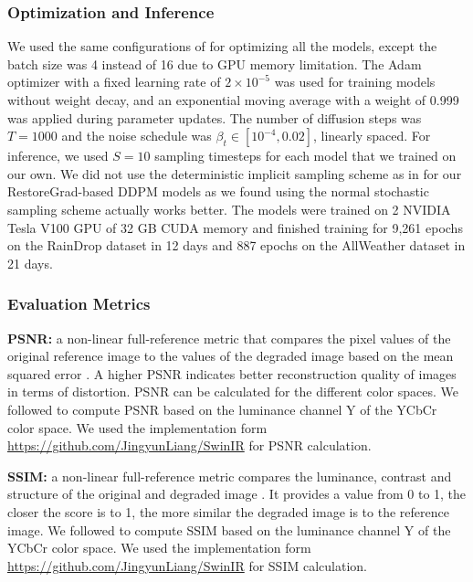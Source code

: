 \subsubsection{Optimization and Inference}
\label{appendix: opt and infer of ir for weather}
We used the same configurations of \citet{ozdenizci2023restoring} for optimizing all the models, except the batch size was 4 instead of 16 due to GPU memory limitation. The Adam optimizer with a fixed learning rate of $2\times 10^{-5}$ was used for training models without weight decay, and an exponential moving average with a weight of 0.999 was applied during parameter updates. The number of diffusion steps was $T=1000$ and the noise schedule was $\beta_t\in[10^{-4}, 0.02]$, linearly spaced. For inference, we used $S=10$ sampling timesteps for each model that we trained on our own. We did not use the deterministic implicit sampling scheme as in \citet{ozdenizci2023restoring} for our RestoreGrad-based DDPM models as we found using the normal stochastic sampling scheme actually works better. The models were trained on 2 NVIDIA Tesla V100 GPU of 32 GB CUDA memory and finished training for 9,261 epochs on the RainDrop dataset in 12 days and 887 epochs on the AllWeather dataset in 21 days.

\subsubsection{Evaluation Metrics}
\noindent\textbf{PSNR:} a non-linear full-reference metric that compares the pixel values of the original reference image to the values of the degraded image based on the mean squared error \citep{huynh2008scope}. A higher PSNR indicates better reconstruction quality of images in terms of distortion. PSNR can be calculated for the different color spaces. We followed \citet{ozdenizci2023restoring} to compute PSNR based on the luminance channel Y of the YCbCr color space. We used the implementation form \url{https://github.com/JingyunLiang/SwinIR} for PSNR calculation.

\noindent\textbf{SSIM:} a non-linear full-reference metric compares the luminance, contrast and structure of the original and degraded image \citep{wang2004image}. It provides a value from 0 to 1,  the closer the score is to 1, the more similar the degraded image is to the reference image. We followed \citet{ozdenizci2023restoring} to compute SSIM based on the luminance channel Y of the YCbCr color space. We used the implementation form \url{https://github.com/JingyunLiang/SwinIR} for SSIM calculation.

